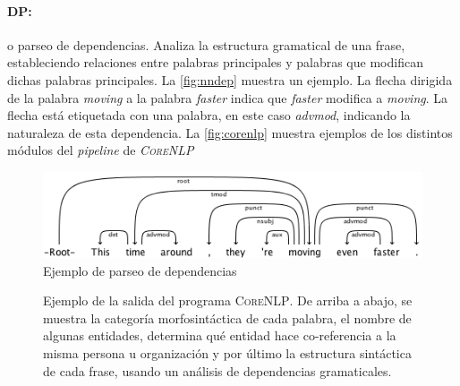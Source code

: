 \paragraph{DP:} o parseo de dependencias. Analiza la
estructura gramatical de una frase, estableciendo relaciones entre palabras
principales y palabras que modifican dichas palabras principales. La
\autoref{fig:nndep} muestra un ejemplo. La flecha dirigida de la palabra
\emph{moving} a la palabra \emph{faster} indica que \emph{faster} modifica a
\emph{moving}. La flecha está etiquetada con una palabra, en este caso
\emph{advmod}, indicando la naturaleza de esta dependencia. La
\autoref{fig:corenlp} muestra ejemplos de los distintos módulos del
\emph{pipeline} de \emph{\textsc{CoreNLP}}

\begin{figure}[bth]
  \includegraphics[width=1\linewidth]{gfx/nndep-example}
  \caption[Ejemplo de parseo de dependencias]{Ejemplo de parseo de dependencias}
  \label{fig:nndep}
\end{figure}

\begin{figure}[bth]
\caption[Ejemplo de parseo de dependencias 2]{Ejemplo de la salida del programa
  \textsc{CoreNLP}. De arriba a abajo, se muestra la categoría morfosintáctica
  de cada palabra, el nombre de algunas entidades, determina qué entidad hace
  co-referencia a la misma persona u organización y por último la estructura
  sintáctica de cada frase, usando un análisis de dependencias gramaticales.}
  \label{fig:corenlp}
\end{figure}


